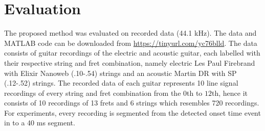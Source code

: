 \documentclass{article}
\begin{document}
\section{Evaluation} %
\label{sec:experiments}
\vspace{-.6mm}
The proposed method was evaluated on recorded data (44.1 kHz). The data and MATLAB code can be downloaded from \url{https://tinyurl.com/yc76blld}. %
The data consists of guitar recordings of the electric and acoustic guitar, each labelled with their respective string and fret combination, namely electric Les Paul Firebrand with Elixir Nanoweb (.10-.54) strings and an acoustic Martin DR with SP (.12-.52) strings. The recorded data of each guitar represents 10 line signal recordings of every string and fret combination from the $0$th to $12$th, hence it consists of 10 recordings of 13 frets and 6 strings which resembles 720 recordings.
For experiments, every recording is segmented from the detected onset time event in to a 40 ms segment. \vspace{-.6mm}
%
%
%
%
%
%
%    
%
%
%
%
\end{document}
